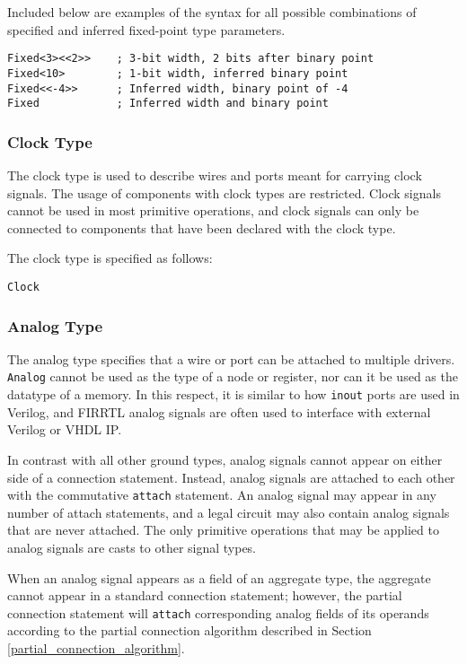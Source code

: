 \documentclass[12pt]{article}
\begin{document}
Included below are examples of the syntax for all possible combinations of specified and inferred
fixed-point type parameters.
\begin{lstlisting}
Fixed<3><<2>>    ; 3-bit width, 2 bits after binary point
Fixed<10>        ; 1-bit width, inferred binary point
Fixed<<-4>>      ; Inferred width, binary point of -4
Fixed            ; Inferred width and binary point
\end{lstlisting}

\subsubsection{Clock Type}

The clock type is used to describe wires and ports meant for carrying clock signals. The usage of components with clock types are restricted. Clock signals cannot be used in most primitive operations, and clock signals can only be connected to components that have been declared with the clock type.

The clock type is specified as follows:
\begin{lstlisting}
Clock
\end{lstlisting}

\subsubsection{Analog Type}

The analog type specifies that a wire or port can be attached to multiple drivers. \verb|Analog|
cannot be used as the type of a node or register, nor can it be used as the datatype of a memory. In
this respect, it is similar to how \verb|inout| ports are used in Verilog, and FIRRTL analog signals
are often used to interface with external Verilog or VHDL IP.

In contrast with all other ground types, analog signals cannot appear on either side of a connection
statement. Instead, analog signals are attached to each other with the commutative \verb|attach|
statement. An analog signal may appear in any number of attach statements, and a legal circuit may
also contain analog signals that are never attached. The only primitive operations that may be
applied to analog signals are casts to other signal types.

When an analog signal appears as a field of an aggregate type, the aggregate cannot appear in a
standard connection statement; however, the partial connection statement will \verb|attach|
corresponding analog fields of its operands according to the partial connection algorithm described
in Section \ref{partial_connection_algorithm}.
\end{document}

